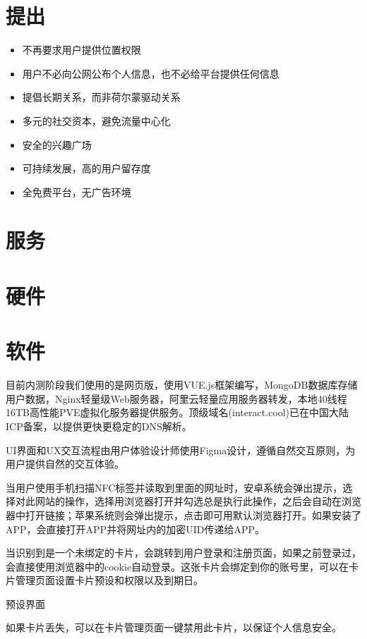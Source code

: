 \documentclass[UTF8]{ctexart}
\begin{document}
\section{提出}
\begin{itemize}
    \item 不再要求用户提供位置权限
    \item 用户不必向公网公布个人信息，也不必给平台提供任何信息
    \item 提倡长期关系，而非荷尔蒙驱动关系
    \item 多元的社交资本，避免流量中心化
    \item 安全的兴趣广场
    \item 可持续发展，高的用户留存度
    \item 全免费平台，无广告环境
\end{itemize}

\section{服务}


\section{硬件}



\section{软件}
目前内测阶段我们使用的是网页版，使用VUE.js框架编写，MongoDB数据库存储用户数据，Nginx轻量级Web服务器，阿里云轻量应用服务器转发，本地40线程16TB高性能PVE虚拟化服务器提供服务。顶级域名(interact.cool)已在中国大陆ICP备案，以提供更快更稳定的DNS解析。

UI界面和UX交互流程由用户体验设计师使用Figma设计，遵循自然交互原则，为用户提供自然的交互体验。

当用户使用手机扫描NFC标签并读取到里面的网址时，安卓系统会弹出提示，选择对此网站的操作，选择用浏览器打开并勾选总是执行此操作，之后会自动在浏览器中打开链接；苹果系统则会弹出提示，点击即可用默认浏览器打开。如果安装了APP，会直接打开APP并将网址内的加密UID传递给APP。

当识别到是一个未绑定的卡片，会跳转到用户登录和注册页面，如果之前登录过，会直接使用浏览器中的cookie自动登录。这张卡片会绑定到你的账号里，可以在卡片管理页面设置卡片预设和权限以及到期日。

预设界面

如果卡片丢失，可以在卡片管理页面一键禁用此卡片，以保证个人信息安全。
\end{document}
